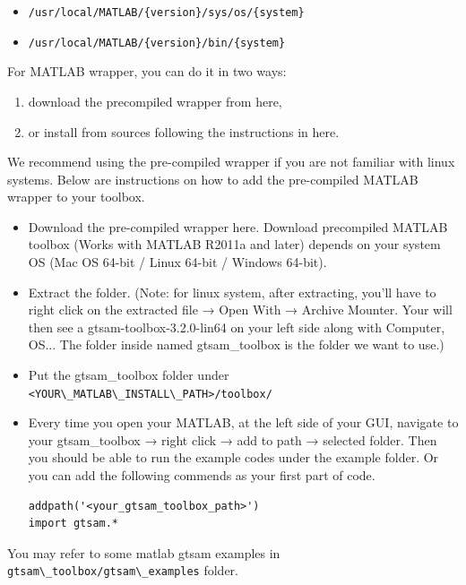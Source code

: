 \documentclass[tp]{lcc}
\begin{document}
\begin{itemize}
    \item \lstinline[style=bash]|/usr/local/MATLAB/{version}/sys/os/{system}|
    \item \lstinline[style=bash]|/usr/local/MATLAB/{version}/bin/{system}|
\end{itemize}

For MATLAB wrapper, you can do it in two ways:

\begin{enumerate}
    \item download the precompiled wrapper from here,
    \item or install from sources following the instructions in here.
\end{enumerate}

We recommend using the pre-compiled wrapper if you are not familiar with linux systems. Below are instructions on how to add the pre-compiled MATLAB wrapper to your toolbox.

\begin{itemize}
    \item Download the pre-compiled wrapper here. Download precompiled MATLAB toolbox (Works with MATLAB R2011a and later) depends on your system OS (Mac OS 64-bit / Linux 64-bit / Windows 64-bit).
    \item Extract the folder. (Note: for linux system, after extracting, you'll have to right click on the extracted file → Open With → Archive Mounter. Your will then see a gtsam-toolbox-3.2.0-lin64 on your left side along with Computer, OS... The folder inside named gtsam\_toolbox is the folder we want to use.)
    \item Put the gtsam\_toolbox folder under \lstinline[style=bash]{<YOUR\_MATLAB\_INSTALL\_PATH>/toolbox/}
    \item Every time you open your MATLAB, at the left side of your GUI, navigate to your gtsam\_toolbox → right click → add to path → selected folder. Then you should be able to run the example codes under the example folder. Or you can add the following commends as your first part of code.
    \begin{lstlisting}[style=bash]
addpath('<your_gtsam_toolbox_path>')
import gtsam.*
    \end{lstlisting}
\end{itemize}

You may refer to some matlab gtsam examples in \lstinline[style=bash]{gtsam\_toolbox/gtsam\_examples} folder.
\end{document}
